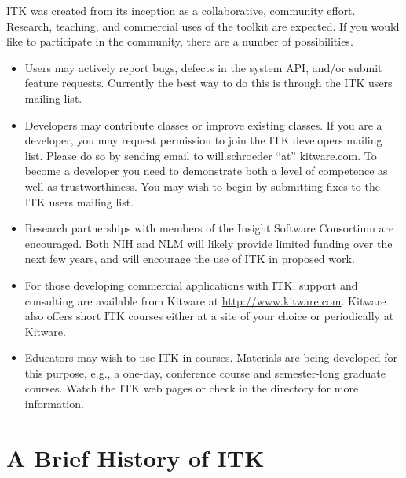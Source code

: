 ITK was created from its inception as a collaborative, community
effort. Research, teaching, and commercial uses of the toolkit are
expected. If you would like to participate in the community, there are a
number of possibilities.

\begin{itemize}
       \item Users may actively report bugs, defects in the system API,
       and/or submit feature requests. Currently the best way to do this is
       through the ITK users mailing list.

       \item Developers may contribute classes or improve existing
       classes. If you are a developer, you may request permission to join
       the ITK developers mailing list. Please do so by sending email to
       will.schroeder ``at'' kitware.com. To become a developer you need to
       demonstrate both a level of competence as well as
       trustworthiness. You may wish to begin by submitting fixes to the ITK
       users mailing list.

       \item Research partnerships with members of the Insight Software
       Consortium are encouraged. Both NIH and NLM will likely provide
       limited funding over the next few years, and will encourage the use of
       ITK in proposed work.

       \item For those developing commercial applications with ITK,
       support and consulting are available from Kitware at
       \url{http://www.kitware.com}. Kitware also offers short ITK courses
       either at a site of your choice or periodically at Kitware.

       \item Educators may wish to use ITK in courses. Materials are being
       developed for this purpose, e.g., a one-day, conference course and
       semester-long graduate courses. Watch the ITK web pages or check in
       the  directory for more information.
\end{itemize}

\section{A Brief History of ITK}
\label{sec:History}

